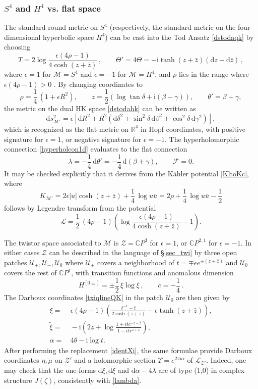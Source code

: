 \documentclass[12pt,reqno]{article}
\numberwithin{equation}{section}
\newcommand{\be}{\begin{equation}}
\newcommand{\ee}{\end{equation}}
\def\({\left(}
\def\){\right)}
\def\[{\left[}
\def\]{\right]}
\def\hf{\frac{1}{2}}
\def\eps{\varepsilon}
\def\bz{\bar z}
\def\bu{\bar u}
\newcommand{\CP}{\IC P^1}
\newcommand{\de}{\mathrm{d}}
\newcommand{\I}{\mathrm{i}}
\newcommand{\cL}{\mathcal{L}}
\newcommand{\cM}{\mathcal{M}}
\newcommand{\cU}{\mathcal{U}}
\newcommand{\cZ}{\mathcal{Z}}
\newcommand{\IR}{\mathbb{R}}
\newcommand{\IC}{\mathbb{C}}
\newcommand{\fb}{\mathscr{F}}
\newcommand{\lb}{\mathscr{L}}
\def\Hij#1{H^{[#1]}}
\newcommand{\txi}{\tilde\xi}
\def\eps{\epsilon}
\def\varpiqk{t}
\def\varpihk{\zeta}
\def\sigp{{\theta}}
\def\phip{{\theta'}}
\def\pTheta{\Theta'}
\def\pcM{\cM'}
\def\pcZ{\cZ'}
\def\Kc{K} %
\def\conhyper{\lambda}
\numberwithin{equation}{section}
\begin{document}
\subsubsection*{\bf $S^4$ and $H^4$ vs. flat space}

The standard round metric on $S^4$ (respectively, the standard metric on the
four-dimensional hyperbolic space $H^4$) can be cast into the Tod Ansatz
\eqref{dstodaqk} by choosing
\be
\label{potTflat}
T=2\log \frac{\epsilon(4\rho-1)}{4\cosh(z+\bz)}\, ,
\qquad
\pTheta=4\Theta=-\I\tanh(z+\bz)(\de z-\de\bz)\, ,
\ee
where $\epsilon=1$ for $\cM=S^4$ and $\eps=-1$ for $\cM=H^4$, and $\rho$
lies in the range where $\eps(4\rho-1)>0$  \cite{Alexandrov:2009vj}.
By changing coordinates to
\be
\rho=\frac14\,(1+\epsilon R^2),
\qquad
z=\hf\(\log\tan \delta+\I(\beta-\gamma)\),
\qquad
\phip=\beta+\gamma,
\ee
the metric on the dual HK space \eqref{dstodahk} can be written as
\be
\de s_{\pcM}^2=\epsilon\[\de R^2+R^2\(\de\delta^2+\sin^2\delta\, \de\beta^2
+\cos^2\delta\, \de\gamma^2\)\],
\ee
which is recognized as the flat metric on $\IR^4$ in Hopf coordinates,
with positive signature for $\eps=1$, or negative signature for $\eps=-1$.
The hyperholomorphic connection \eqref{hyperholcon1d} evaluates to the flat connection
\be
\conhyper = -\frac14\,\de\phip=-\frac14\, \de(\beta+\gamma) ,
\qquad
\fb=0.
\label{flathypercon}
\ee
It may be checked explicitly that it derives from the K\"ahler potential \eqref{KltoKc},
where
\be
\Kc_{\pcM}=2\epsilon|u|\cosh(z+\bz)+\frac14\,\log u\bu = 2\rho +\frac14\,\log u\bu - \frac12
\label{flatKM}
\ee
follows by Legendre transform from the potential
\be
\cL=\hf\, (4\rho-1)\(\log\frac{\epsilon(4\rho-1)}{4\cosh(z+\bz)}-1\) .
\ee


The twistor space associated to $\cM$ is $\cZ=\IC P^3$ for $\eps=1$, or $\IC P^{2,1}$
for $\eps=-1$. In either cases $\cZ$ can be described in the language of \S\ref{sec_twi}
by three open patches $\cU_+,\cU_-,\cU_0$ where $\cU_\pm$ covers a neighborhood of
$\varpiqk=\mp \eps e^{\pm(z+\bar z)}$ and $\cU_0$ covers the rest of $\CP$, with
 transition functions and anomalous dimension  \cite{Alexandrov:2009vj}
\be
\Hij{0\pm}=\pm\hf\,\xi\log\xi\, ,
\qquad
c=-\frac14\, .
\ee
The Darboux coordinates \eqref{txiqlineQK} in the patch $\cU_0$  are then given by
\be
\begin{split}
\xi=&\, \epsilon(4\rho-1)\(\frac{\varpiqk^{-1}-\varpiqk}{2\cosh(z+\bz)}-\epsilon\tanh(z+\bz)\) ,
\\
\txi=&\, -\I\(2z+\log\frac{1+\epsilon\varpiqk e^{-z-\bz}}{1-\epsilon\varpiqk e^{z+\bz}}\) ,
\\
\alpha=&\, 4\sigp-\I\log\varpiqk .
\end{split}
\ee
After performing the replacement \eqref{identXi}, the same formulae
provide Darboux coordinates $\eta,\mu$ on $\pcZ$ and a holomorphic section
$\Upsilon=e^{2\pi\I\alpha}$ of $\lb_{\pcZ}$. Indeed, one may check
that the one-forms $\de\xi, \de\txi$ and $\de\alpha-4\lambda$ are of type (1,0) in complex
structure $J(\varpihk)$, consistently with \eqref{lambda}.
\end{document}
